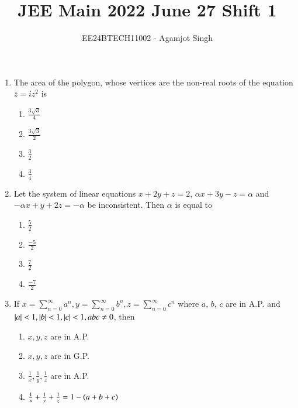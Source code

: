 \documentclass[journal,onecolumn]{IEEEtran}
\theoremstyle{remark}
\begin{document}

\vspace{3cm}

\title{JEE Main 2022 June 27 Shift 1}
\author{EE24BTECH11002 - Agamjot Singh}
\maketitle

\renewcommand{\thefigure}{\theenumi}
\renewcommand{\thetable}{\theenumi}

\begin{enumerate}
    \item The area of the polygon, whose vertices are the non-real roots of the equation $\bar{z} = iz^2$ is

	\begin{enumerate}
		\item $\frac{3\sqrt{3}}{4}$
		\item $\frac{3\sqrt{3}}{2}$
		\item $\frac{3}{2}$
		\item $\frac{3}{4}$
	\end{enumerate}

    \item Let the system of linear equations $x + 2y + z = 2$, $\alpha x + 3y - z = \alpha$ and $-\alpha x + y + 2z = -\alpha$ be inconsistent. Then $\alpha$ is equal to

	\begin{enumerate}
		\item $\frac{5}{2}$
		\item $\frac{-5}{2}$
		\item $\frac{7}{2}$
		\item $\frac{-7}{2}$
	\end{enumerate}

    \item If $x = \sum^{\infty}_{n = 0} a^n,  y = \sum^{\infty}_{n = 0} b^n,  z = \sum^{\infty}_{n = 0} c^n$ where $a$, $b$, $c$ are in A.P. and $\left\vert a\right\vert < 1, \left\vert b\right\vert < 1, \left\vert c\right\vert < 1, abc \neq 0$, then  

	\begin{enumerate}
		\item $x, y, z$ are in A.P. 
		\item $x, y, z$ are in G.P. 
		\item $\frac{1}{x}, \frac{1}{y}, \frac{1}{z}$ are in A.P. 
		\item $\frac{1}{x} + \frac{1}{y} + \frac{1}{z} = 1 - \left(a + b+ c\right)$ 
	\end{enumerate}



\end{enumerate}
\end{document}
